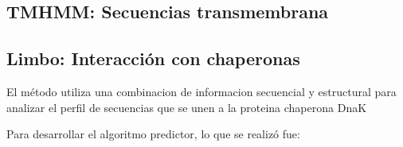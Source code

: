   
  
  
  
\subsection{TMHMM: Secuencias transmembrana} \label{tmhmm}






\subsection{Limbo: Interacción con chaperonas} \label{limbo}


\cite{van2009accurate}


El método utiliza una combinacion de informacion secuencial y estructural para analizar el perfil de secuencias que se unen a la proteina chaperona DnaK

Para desarrollar el algoritmo predictor, lo que se realizó fue:

